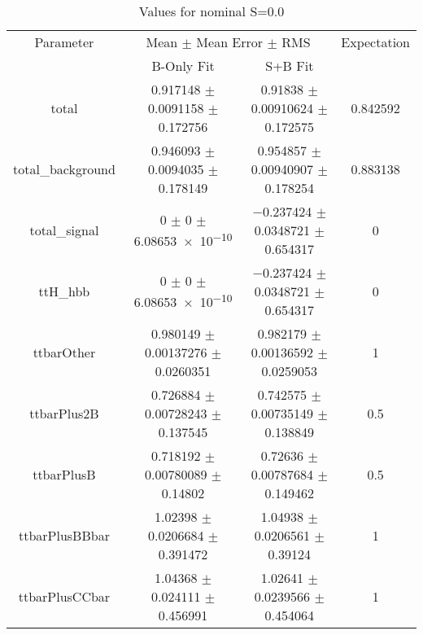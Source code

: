 \begin{table}
\centering
\caption{Values for nominal S=0.0}
\begin{tabular}{cccc}
\toprule
Parameter & \multicolumn{2}{c}{Mean $\pm$ Mean Error $\pm$ RMS} & Expectation\\
 & B-Only Fit & S+B Fit & \\
\midrule
total & \num{0.917148} $\pm$ \num{0.0091158} $\pm$ \num{0.172756} & \num{0.91838} $\pm$ \num{0.00910624} $\pm$ \num{0.172575} & \num{0.842592}\\
total\_background & \num{0.946093} $\pm$ \num{0.0094035} $\pm$ \num{0.178149} & \num{0.954857} $\pm$ \num{0.00940907} $\pm$ \num{0.178254} & \num{0.883138}\\
total\_signal & \num{0} $\pm$ \num{0} $\pm$ \num{6.08653e-10} & \num{-0.237424} $\pm$ \num{0.0348721} $\pm$ \num{0.654317} & \num{0}\\
ttH\_hbb & \num{0} $\pm$ \num{0} $\pm$ \num{6.08653e-10} & \num{-0.237424} $\pm$ \num{0.0348721} $\pm$ \num{0.654317} & \num{0}\\
ttbarOther & \num{0.980149} $\pm$ \num{0.00137276} $\pm$ \num{0.0260351} & \num{0.982179} $\pm$ \num{0.00136592} $\pm$ \num{0.0259053} & \num{1}\\
ttbarPlus2B & \num{0.726884} $\pm$ \num{0.00728243} $\pm$ \num{0.137545} & \num{0.742575} $\pm$ \num{0.00735149} $\pm$ \num{0.138849} & \num{0.5}\\
ttbarPlusB & \num{0.718192} $\pm$ \num{0.00780089} $\pm$ \num{0.14802} & \num{0.72636} $\pm$ \num{0.00787684} $\pm$ \num{0.149462} & \num{0.5}\\
ttbarPlusBBbar & \num{1.02398} $\pm$ \num{0.0206684} $\pm$ \num{0.391472} & \num{1.04938} $\pm$ \num{0.0206561} $\pm$ \num{0.39124} & \num{1}\\
ttbarPlusCCbar & \num{1.04368} $\pm$ \num{0.024111} $\pm$ \num{0.456991} & \num{1.02641} $\pm$ \num{0.0239566} $\pm$ \num{0.454064} & \num{1}\\
\bottomrule
\end{tabular}
\end{table}
